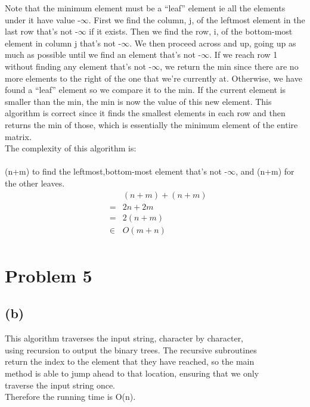 \documentclass{article}[12pt]
\begin{document}
Note that the minimum element must be a ``leaf'' element ie all the elements under it have value -$\infty$. First we find the column, j, of the leftmost element in the last row that's not -$\infty$ if it exists. Then we find the row, i, of the bottom-most element in column j that's not -$\infty$. We then proceed across and up, going up as much as possible until we find an element that's not -$\infty$. If we reach row 1 without finding any element that's not -$\infty$, we return the min since there are no more elements to the right of the one that we're currently at. Otherwise, we have found a ``leaf'' element so we compare it to the min. If the current element is smaller than the min, the min is now the value of this new element. This algorithm is correct since it finds the smallest elements in each row and then returns the min of those, which is essentially the minimum element of the entire matrix. \\

The complexity of this algorithm is: \\ \\
  (n+m) to find the leftmost,bottom-most element that's not -$\infty$, and (n+m) for the other leaves. \\
\begin{eqnarray*}
  & & (n + m) + (n + m) \\
  & = & 2n + 2 m \\
  & = & 2(n+m) \\
  & \in & O(m+n) \\
\end{eqnarray*}


\section*{Problem 5}
\subsection*{(b)}


This algorithm traverses the input string, character by character, \\
using recursion to output the binary trees. The recursive subroutines \\
return the index to the element that they have reached, so the main \\
method is able to jump ahead to that location, ensuring that we only \\
traverse the input string once. \\
Therefore the running time is O(n). \\
\end{document}
